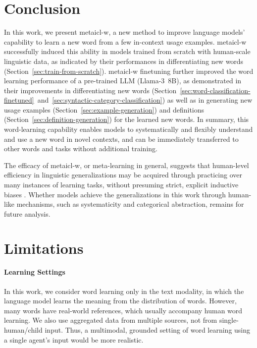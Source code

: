 \documentclass{article}
\begin{document}
\section{Conclusion}
In this work, we present \ac{metaicl-w}, a new method to improve language models' capability to learn a new word from a few in-context usage examples.
\ac{metaicl-w} successfully induced this ability in models trained from scratch with human-scale linguistic data, as indicated by their performances in differentiating new words (Section~\ref{sec:train-from-scratch}).
\ac{metaicl-w} finetuning further improved the word learning performance of a pre-trained LLM (\mbox{Llama-3 8B}), as demonstrated in their improvements in differentiating new words (Section~\ref{sec:word-classification-finetuned}~and~\ref{sec:syntactic-category-classification}) as well as in generating new usage examples (Section~\ref{sec:example-generation}) and definitions (Section~\ref{sec:definition-generation}) for the learned new words.
In summary, this word-learning capability enables models to systematically and flexibly understand and use a new word in novel contexts, and can be immediately transferred to other words and tasks without additional training.

The efficacy of \ac{metaicl-w}, or meta-learning in general, suggests that human-level efficiency in linguistic generalizations may be acquired through practicing over many instances of learning tasks, without presuming strict, explicit inductive biases \citep{Russin2024Frege,Irie2024NNPractice}.
Whether models achieve the generalizations in this work through human-like mechanisms, such as systematicity and categorical abstraction, remains for future analysis.

\section{Limitations} %


\paragraph{Learning Settings}
In this work, we consider word learning only in the text modality, in which the language model learns the meaning from the distribution of words. However, many words have real-world references, which usually accompany human word learning.
We also use aggregated data from multiple sources, not from single-human/child input.
Thus, a multimodal, grounded setting of word learning using a single agent's input would be more realistic.
\end{document}
